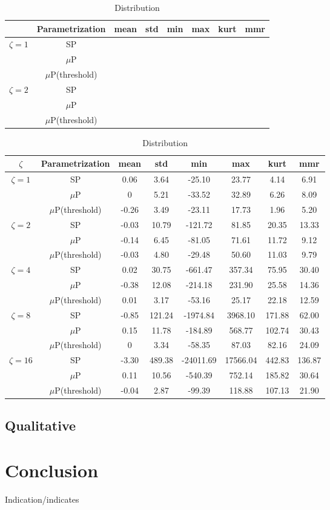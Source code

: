 \documentclass{article}
\newcommand{\mup}{$\mu$P}
\begin{document}
\begin{table}[h!]
\Centering
\begin{tabular}{cccccccc}
\toprule
& Parametrization & mean & std & min & max & kurt & mmr\\
\midrule
\multirow{3}{*}{$\zeta=1$} & SP & \\
& \mup &\\
& \mup (threshold) &\\
\cmidrule{1-8}
\multirow{3}{*}{$\zeta=2$} & SP & \\
& \mup &\\
& \mup (threshold) &\\
\bottomrule
\end{tabular}
\caption{Distribution}
\end{table}

\begin{table}[h!]
\centering
\begin{tabular}{cccccccc}
\toprule
$\zeta$ & Parametrization & mean & std & min & max & kurt & mmr\\
\midrule
\multirow{3}{*}{$\zeta=1$} & SP & 0.06 & 3.64 & -25.10 & 23.77 & 4.14 & 6.91 \\
& \mup & 0 & 5.21 & -33.52 & 32.89 & 6.26 & 8.09 \\
& \mup (threshold) & -0.26 & 3.49 & -23.11 & 17.73 & 1.96 & 5.20 \\
\cmidrule{1-8}
\multirow{3}{*}{$\zeta=2$} & SP & -0.03 & 10.79 & -121.72 & 81.85 & 20.35 & 13.33 \\
& \mup & -0.14 & 6.45 & -81.05 & 71.61 & 11.72 & 9.12 \\
& \mup (threshold) & -0.03 & 4.80 & -29.48 & 50.60 & 11.03 & 9.79 \\
\cmidrule{1-8}
\multirow{3}{*}{$\zeta=4$} & SP & 0.02 & 30.75 & -661.47 & 357.34 & 75.95 & 30.40 \\
& \mup & -0.38 & 12.08 & -214.18 & 231.90 & 25.58 & 14.36 \\
& \mup (threshold) & 0.01 & 3.17 & -53.16 & 25.17 & 22.18 & 12.59 \\
\cmidrule{1-8}
\multirow{3}{*}{$\zeta=8$} & SP & -0.85 & 121.24 & -1974.84 & 3968.10 & 171.88 & 62.00 \\
& \mup & 0.15 & 11.78 & -184.89 & 568.77 & 102.74 & 30.43 \\
& \mup (threshold) & 0 & 3.34 & -58.35 & 87.03 & 82.16 & 24.09 \\
\cmidrule{1-8}
\multirow{3}{*}{$\zeta=16$} & SP & -3.30 & 489.38 & -24011.69 & 17566.04 & 442.83 & 136.87 \\
& \mup & 0.11 & 10.56 & -540.39 & 752.14 & 185.82 & 30.64 \\
& \mup (threshold) & -0.04 & 2.87 & -99.39 & 118.88 & 107.13 & 21.90 \\
\bottomrule
\end{tabular}
\caption{Distribution}
\end{table}

\subsection{Qualitative}

\section{Conclusion}
Indication/indicates

\printbibliography
\end{document}
